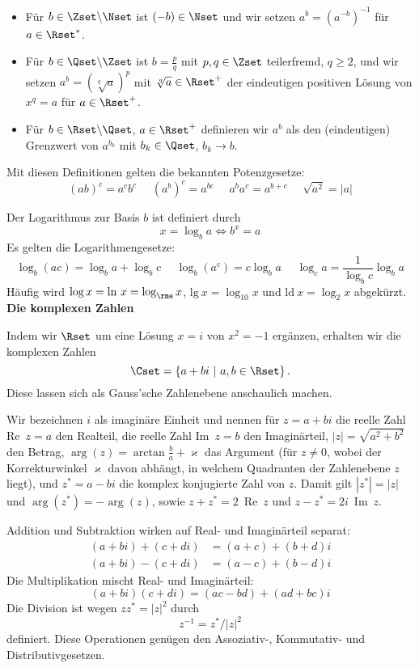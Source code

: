\documentclass[a4paper,10pt]{article}
\begin{document}
\begin{itemize}

\item Für $b\in\Zset\backslash\Nset$ ist $(-b)\in\Nset$ und wir setzen $a^b=(a^{-b})^{-1}$ für $a\in\Rset^*$.

\item Für $b\in\Qset\backslash\Zset$ ist $b=\frac{p}{q}$ mit $p,q\in\Zset$ teilerfremd, $q\ge 2$, und wir setzen $a^b=(\sqrt[q]{a})^p$ mit $\sqrt[q]{a}\in\Rset^+$ der eindeutigen positiven Lösung von $x^q=a$ für $a\in\Rset^+$.

\item Für $b\in\Rset\backslash\Qset$, $a\in\Rset^+$ definieren wir $a^b$ als den (eindeutigen) Grenzwert von $a^{b_k}$ mit $b_k\in\Qset$, $b_k\to b$.

\end{itemize}
Mit diesen Definitionen gelten die bekannten Potenzgesetze:
\[
(ab)^c=a^cb^c~~~~~~
(a^b)^c=a^{bc}~~~~~~
a^ba^c=a^{b+c}~~~~~~
\sqrt{a^2}=|a|
\]

Der Logarithmus zur Basis $b$ ist definiert durch
\[
x = \log_b a \Leftrightarrow b^x=a
\]
Es gelten die Logarithmengesetze:
\[
\log_b(ac)=\log_b a + \log_b c~~~~~~
\log_b(a^c)=c\log_b a ~~~~~~
\log_c a = \frac{1}{\log_b c}\log_b a
\]
Häufig wird $\log x=\mathrm{ln~}x=\log_{\rme} x$, $\mathrm{lg~}x=\log_{10}x$
und $\mathrm{ld~}x=\log_2 x$ abgekürzt.\\


{\bf Die komplexen Zahlen}

Indem wir $\Rset$ um eine Lösung $x=i$ von $x^2=-1$ ergänzen, erhalten wir die komplexen Zahlen
\[
\Cset =\{a+bi~|~a,b\in\Rset\}\,.
\]
Diese lassen sich als Gauss'sche Zahlenebene anschaulich machen.

Wir bezeichnen $i$ als imaginäre Einheit und nennen
      für $z=a+bi$
die reelle Zahl Re~$z=a$ den Realteil,
die reelle Zahl Im~$z=b$ den Imaginärteil,
$|z|=\sqrt{a^2+b^2}$ den Betrag,
$\arg(z)=\arctan\frac{b}{a} +\varkappa$ das Argument (für $z\not=0$, wobei der Korrekturwinkel $\varkappa$ davon abhängt, in welchem Quadranten der Zahlenebene $z$ liegt),
und $z^*=a-bi$ die komplex konjugierte Zahl
von $z$. Damit gilt $|z^*|=|z|$ und $\arg(z^*)=-\arg(z)$, sowie $z+z^*=2$~Re~$z$ und $z-z^*=2i$~Im~$z$.

Addition und Subtraktion wirken auf Real- und Imaginärteil separat:
\begin{align*}
(a+bi)+(c+di) &= (a+c)+(b+d)i\\
(a+bi)-(c+di) &= (a-c)+(b-d)i
\end{align*}
Die Multiplikation mischt Real- und Imaginärteil:
\[
(a+bi)(c+di) = (ac-bd)+(ad+bc)i
\]
Die Division ist wegen $zz^*=|z|^2$ durch
\[
z^{-1} = z^*/|z|^2
\]
definiert. Diese Operationen genügen den Assoziativ-, Kommutativ- und Distributivgesetzen.
\end{document}

